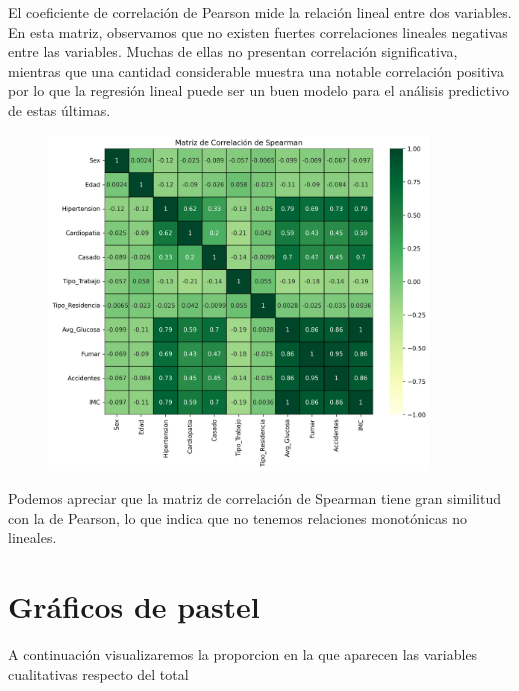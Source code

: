 \documentclass[a4paper, 12pt]{article}
\begin{document}
El coeficiente de correlación de Pearson mide la relación lineal entre dos variables. En esta matriz, 
observamos que no existen fuertes correlaciones lineales negativas entre las variables. Muchas de ellas 
no presentan correlación significativa, mientras que una cantidad considerable muestra una notable 
correlación positiva por lo que la regresión lineal puede ser un buen modelo para el análisis predictivo de estas últimas.

\begin{figure}[h]
    \centering
    \includegraphics[width=0.9\textwidth]{img/matriz_correlacion_spearman.png}
\end{figure}

Podemos apreciar que la matriz de correlación de Spearman tiene gran similitud con la de Pearson, lo que indica que no tenemos relaciones monotónicas no lineales.








\section{Gráficos de pastel}
A continuación visualizaremos la proporcion en la que aparecen las variables cualitativas respecto del total
\end{document}
